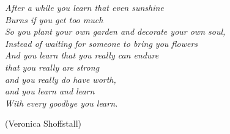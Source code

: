 \begin{epigrafe}{
    \it
    After a while you learn that even sunshine \\
    Burns if you get too much \\

    So you plant your own garden and decorate your own soul, \\
    Instead of waiting for someone to bring you flowers \\

    And you learn that you really can endure \\
    that you really are strong \\
    and you really do have worth, \\
    and you learn and learn \\
    With every goodbye you learn.
}

    \hfill (Veronica Shoffstall)
\end{epigrafe}